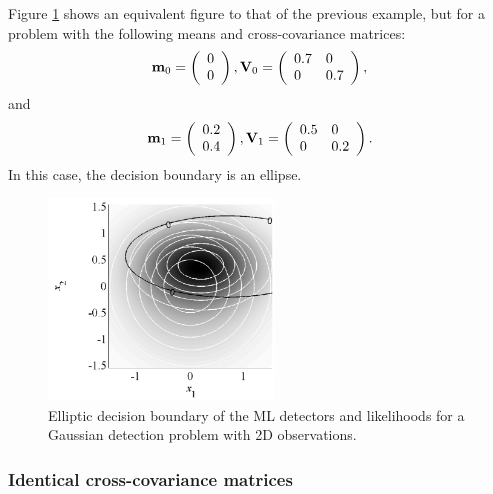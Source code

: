 \begin{example}
	Figure \ref{fig:DecGauss2Delip} shows an equivalent figure to that of the previous example, but for a problem with the following means and cross-covariance matrices:
		\begin{equation*}
	{\bf m}_0 =  \left(\begin{array}{l}  0\\0  \end{array}\right), {\bf V}_0 = 
	\left(\begin{array}{ll} 0.7 & 0 \\ 0 & 0.7 \end{array} \right),
	\end{equation*}
	and
	\begin{equation*}
	{\bf m}_1 = \left(\begin{array}{l}  0.2 \\ 0.4 \end{array}\right), {\bf V}_1 = 
	\left(\begin{array}{ll} 0.5 & 0 \\ 0 & 0.2 \end{array} \right).
	\end{equation*}
	In this case, the decision boundary is an ellipse.
	\begin{figure}[htb]
		\begin{center}
			\includegraphics[width=6cm]{Figures/DecGauss2Delip.pdf}
			\caption{Elliptic decision boundary of the ML detectors and likelihoods for a Gaussian detection problem with 2D observations.}
			\label{fig:DecGauss2Delip}
		\end{center}
	\end{figure}
\end{example}

\subsubsection{Identical cross-covariance matrices}

